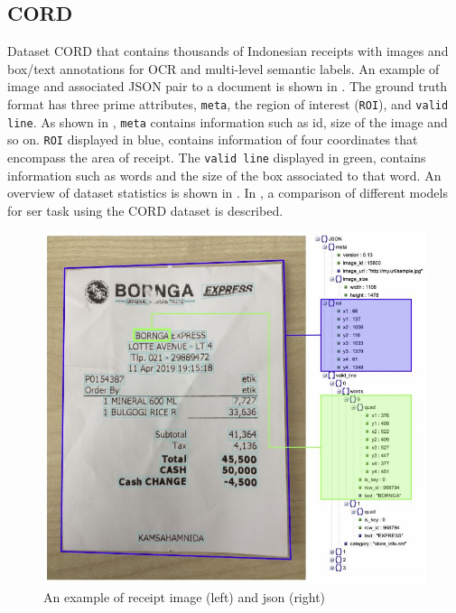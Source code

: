 \subsection{CORD}
Dataset CORD \cite{park2019cord} that contains thousands of Indonesian receipts with images and box/text annotations for OCR and multi-level semantic labels. An example of image and associated JSON pair to a document is shown in . The ground truth format has three prime attributes, \verb|meta|, the region of interest (\verb|ROI|), and \verb|valid line|. As shown in , \verb|meta| contains information such as id, size of the image and so on. \verb|ROI| displayed in blue, contains information of four coordinates that encompass the area of receipt. The \verb|valid line| displayed in green, contains information such as words and the size of the box associated to that word. An overview of dataset statistics is shown in . In , a comparison of different models for \acrshort{ser} task using the CORD dataset is described.

\begin{figure}[!ht]
    \centering
    \includegraphics[width=0.6 \textwidth]{chapters/images/Methods/Datasets/CORD.JPG}
    \caption{ An example of receipt image (left) and json (right) \cite{park2019cord}}
    \label{fig:CORD_example_image}
\end{figure}

